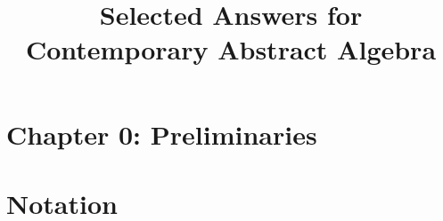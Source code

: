 \documentclass{article}
\title{Selected Answers for Contemporary Abstract Algebra}
\author{\studentname}
\begin{document}
\maketitle



\tableofcontents

\section{Chapter 0: Preliminaries}



\section{Notation}


\end{document}
